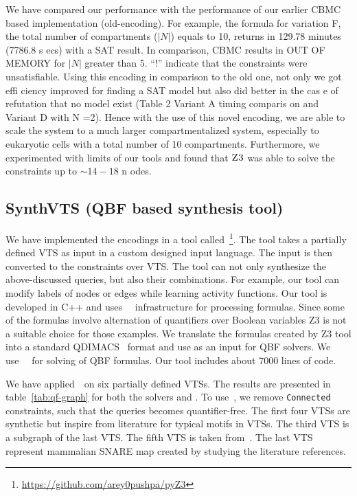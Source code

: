 We have compared our performance with the performance of our earlier
CBMC based implementation (old-encoding).
%
For example, the formula for variation F, the total number of
compartments ($|N|$) equals to 10, returns in 129.78 minutes (7786.8 s
ecs)
with a SAT result.
%
In comparison, CBMC results in OUT OF MEMORY for $|N|$ greater than 5.
%
``!'' indicate that the constraints were unsatisfiable.
%
Using this encoding in comparison to the old one, not only we got effi
ciency improved for finding a SAT model but also did better in the cas
e of refutation that no model exist (Table 2 Variant A timing comparis
on and Variant D with N =2). 
%
Hence with the use of this novel encoding, we are able to scale the system to a much larger compartmentalized system, especially to
eukaryotic cells with a total number of 10 compartments.
%
Furthermore, we experimented with limits of our tools and found
that $\textsc{Z3}$ was able to solve the constraints up to $\sim{14-18}$ n
odes.



\subsection{SynthVTS (QBF based synthesis tool)} 
We have implemented the encodings in a tool
called~\ourtool\footnote{{\url{https://github.com/arey0pushpa/pyZ3}}}.
%
The tool takes a partially defined VTS as input in a custom designed
input language.
%
The input is then converted to the constraints over VTS. 
%
The tool can not only synthesize the above-discussed queries, but also their
combinations.
%
For example, our tool can modify labels of nodes or edges while
learning activity functions.
%
Our tool is developed in C++ and uses~\zthree~\cite{z3} infrastructure for
processing formulas. 
%
Since some of the formulas involve alternation of quantifiers over
Boolean variables Z3 is not a suitable choice for those examples.
%
We translate the formulas created by Z3 tool into a standard
QDIMACS~\cite{qdimacs} format and use as an input for QBF solvers. 
%
We use~\depqbf~\cite{lonsing2010depqbf} for solving of QBF formulas. 
%
Our tool includes about 7000 lines of code.

We have applied~\ourtool~on six partially defined VTSs.
%
The results are presented in table~\ref{tab:qf-graph} for both the solvers
\depqbf and \zthree.
%
To use~\zthree, we remove \texttt{Connected} constraints, such that the queries becomes
quantifier-free.
%
%
%
The first four VTSs are synthetic but inspire from literature for
typical motifs in VTSs. 
The third VTS is a subgraph of the last VTS.
%
%
The fifth VTS is taken from~\cite{burri2004complete}.
%
The last VTS represent mammalian SNARE map created by studying the literature references.  

